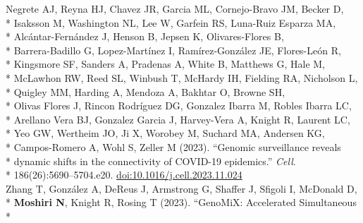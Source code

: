 \documentclass[margin,line]{res}
\begin{document}
\begin{resume}
\hspace*{9.5mm} Negrete AJ, Reyna HJ, Chavez JR, Garcia ML, Cornejo-Bravo JM, Becker D,\\*
\hspace*{9.5mm} Isaksson M, Washington NL, Lee W, Garfein RS, Luna-Ruiz Esparza MA,\\*
\hspace*{9.5mm} Alc\'{a}ntar-Fern\'{a}ndez J, Henson B, Jepsen K, Olivares-Flores B,\\*
\hspace*{9.5mm} Barrera-Badillo G, Lopez-Mart\'{i}nez I, Ram\'{i}rez-Gonz\'{a}lez JE, Flores-Le\'{o}n R,\\*
\hspace*{9.5mm} Kingsmore SF, Sanders A, Pradenas A, White B, Matthews G, Hale M,\\*
\hspace*{9.5mm} McLawhon RW, Reed SL, Winbush T, McHardy IH, Fielding RA, Nicholson L,\\*
\hspace*{9.5mm} Quigley MM, Harding A, Mendoza A, Bakhtar O, Browne SH,\\*
\hspace*{9.5mm} Olivas Flores J, Rincon Rodríguez DG, Gonzalez Ibarra M, Robles Ibarra LC,\\*
\hspace*{9.5mm} Arellano Vera BJ, Gonzalez Garcia J, Harvey-Vera A, Knight R, Laurent LC,\\*
\hspace*{9.5mm} Yeo GW, Wertheim JO, Ji X, Worobey M, Suchard MA, Andersen KG,\\*
\hspace*{9.5mm} Campos-Romero A, Wohl S, Zeller M (2023). ``Genomic surveillance reveals\\*
\hspace*{9.5mm} dynamic shifts in the connectivity of COVID-19 epidemics.'' \textit{Cell}.\\*\vspace{2mm}
\hspace*{8mm} 186(26):5690--5704.e20. \href{https://doi.org/10.1016/j.cell.2023.11.024}{doi:10.1016/j.cell.2023.11.024}\\
\hspace*{4mm} Zhang T, Gonz\'alez A, DeReus J, Armstrong G, Shaffer J, Sfigoli I, McDonald D,\\*
\hspace*{9.5mm} \textbf{Moshiri N}, Knight R, Rosing T (2023). ``GenoMiX: Accelerated Simultaneous\\*

\end{resume}
\end{document}
